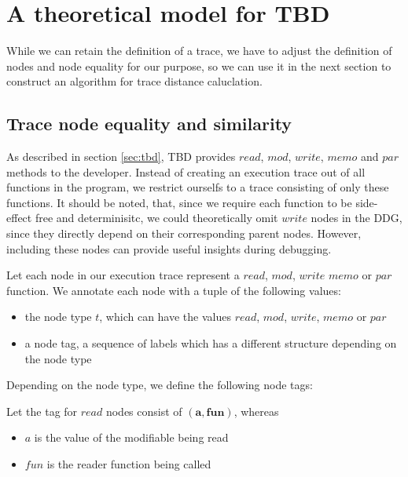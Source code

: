\section{A theoretical model for TBD}
While we can retain the definition of a trace, we have to adjust the definition of nodes and node equality for our purpose, so we can use it in the next section to construct an algorithm for trace distance caluclation. 

\subsection{Trace node equality and similarity}
\label{sec:node_equality}
As described in section \ref{sec:tbd}, TBD provides $read$, $mod$, $write$, $memo$ and $par$ methods to the developer. Instead of creating an execution trace out of all  functions in the program, we restrict ourselfs to a trace consisting of only these functions. It should be noted, that, since we require each function to be side-effect free and determinisitc, we could theoretically omit $write$ nodes in the DDG, since they directly depend on their corresponding parent nodes. However, including these nodes can provide useful insights during debugging. 

\begin{definition}
Let each node in our execution trace represent a $read$, $mod$, $write$ $memo$ or $par$ function. We annotate each node with a tuple of the following values:
\begin{itemize}
\item the node type $t$, which can have the values $read$, $mod$, $write$, $memo$ or $par$
\item a node tag, a sequence of labels which has a different structure depending on the node type 
\end{itemize}
\end{definition}

Depending on the node type, we define the following node tags: 

\begin{definition}
Let the tag for $read$ nodes consist of $\mathbf{(a, fun)}$, whereas
\begin{itemize}
\item $a$ is the value of the modifiable being read
\item $fun$ is the reader function being called
\end{itemize}
\end{definition}

